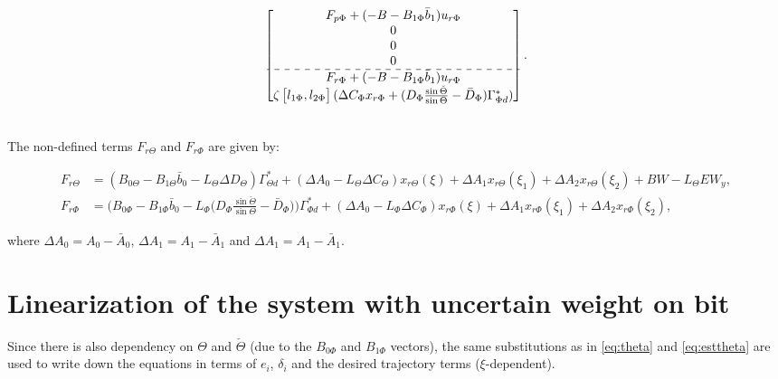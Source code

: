\documentclass[../main.tex]{subfiles}
\begin{document}
\begin{align*}
\begin{bmatrix}
F_{p\Phi} + (-B - B_{1\Phi}\bar{b}_1)u_{r\Phi}\\
0 \\
0 \\
0 \\ \hdashline
F_{r\Phi} + (-B - B_{1\Phi}\bar{b}_1)u_{r\Phi}\\
\zeta \begin{bmatrix}l_{1\Phi} , l_{2\Phi}\end{bmatrix} (\Delta C_\Phi x_{r\Phi} + (D_\Phi\frac{\sin \check{\Theta}}{\sin \Theta} - \bar{D}_\Phi)\Gamma_{\Phi d}^*) \\		
\end{bmatrix}.
\\\nonumber
\end{align*}
\endgroup

The non-defined terms $F_{r\Theta}$ and $F_{r\Phi}$ are given by:

\begin{align}
F_{r\Theta} &= (B_{0\Theta} - B_{1\Theta} \bar{b}_0 - L_\Theta \Delta D_\Theta)\Gamma_{\Theta d}^* +  (\Delta A_0 - L_\Theta \Delta C_\Theta) x_{r\Theta} (\xi) + \Delta A_1 x_{r\Theta} (\xi_1) + \Delta A_2 x_{r\Theta} (\xi_2) + BW - L_\Theta EW_y \label{eq:PerturbationForces1obs},\\
F_{r\Phi} &= \bigg(B_{0\Phi} - B_{1\Phi} \bar{b}_0 - L_\Phi \bigg(D_\Phi\frac{\sin \check{\Theta}}{\sin \Theta} - \bar{D}_\Phi \bigg)\bigg)\Gamma_{\Phi d}^* + (\Delta A_0 - L_\Phi \Delta C_\Phi) x_{r\Phi} (\xi) + \Delta A_1 x_{r\Phi} (\xi_1) + \Delta A_2 x_{r\Phi} (\xi_2) \label{eq:PerturbationForces2obs},
\end{align}

where $\Delta A_0 = A_0 - \bar{A}_0$, $\Delta A_1 = A_1 - \bar{A}_1$ and $\Delta A_1 = A_1 - \bar{A}_1$.

\section{Linearization of the system with uncertain weight on bit}

Since there is also dependency on $\Theta$ and $\check{\Theta}$ (due to the $B_{0\Phi}$ and $B_{1\Phi}$ vectors), the same substitutions as in \eqref{eq:theta} and \eqref{eq:esttheta} are used to write down the equations in terms of $e_i$, $\delta_i$ and the desired trajectory terms ($\xi$-dependent).
\end{document}
